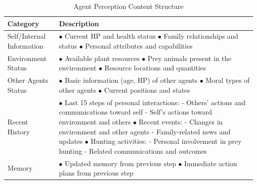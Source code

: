 \begin{table}[htbp]
    \centering
    \caption{Agent Perception Content Structure}
    \label{tab:agent_perception}
    \small
    \setlength{\tabcolsep}{4pt}
    \begin{tabular}{p{4cm}p{9cm}}
    \toprule
    \textbf{Category} & \textbf{Description} \\
    \midrule
    Self/Internal Information & 
    $\bullet$ Current HP and health status \newline
    $\bullet$ Family relationships and status \newline
    $\bullet$ Personal attributes and capabilities \\
    \midrule
    Environment Status & 
    $\bullet$ Available plant resources \newline
    $\bullet$ Prey animals present in the environment \newline
    $\bullet$ Resource locations and quantities \\
    \midrule
    Other Agents Status & 
    $\bullet$ Basic information (age, HP) of other agents \newline
    $\bullet$ Moral types of other agents \newline
    $\bullet$ Current positions and states \\
    \midrule
    Recent History & 
    $\bullet$ Last 15 steps of personal interactions: \newline
    \hspace*{1em} - Others' actions and communications toward self \newline
    \hspace*{1em} - Self's actions toward environment and others \newline
    $\bullet$ Recent events: \newline
    \hspace*{1em} - Changes in environment and other agents \newline
    \hspace*{1em} - Family-related news and updates \newline
    $\bullet$ Hunting activities: \newline
    \hspace*{1em} - Personal involvement in prey hunting \newline
    \hspace*{1em} - Related communications and outcomes \\
    \midrule
    Memory & 
    $\bullet$ Updated memory from previous step \newline
    $\bullet$ Immediate action plans from previous step \\
    \bottomrule
    \end{tabular}
\end{table}


